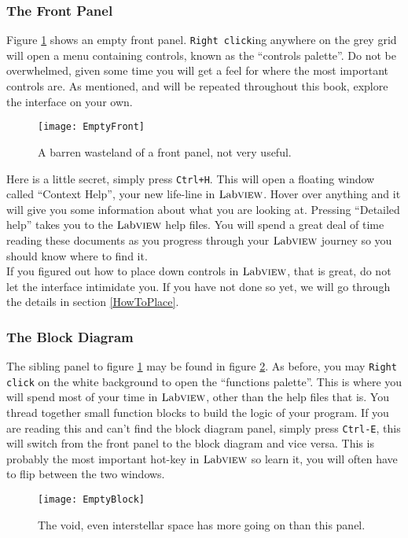 	\subsubsection{The Front Panel}
	Figure \ref{EmptyFront} shows an empty front panel. \texttt{Right click}ing anywhere on the grey grid will open a menu containing controls, known as the ``controls palette''. Do not be overwhelmed, given some time you will get a feel for where the most important controls are. As mentioned, and will be repeated throughout this book, explore the interface on your own.\\
	\begin{figure}
		\centering
		\texttt{[image: EmptyFront]}
		\caption{A barren wasteland of a front panel, not very useful.}
		\label{EmptyFront}
	\end{figure}

	Here is a little secret, simply press \texttt{Ctrl+H}. This will open a floating window called ``Context Help'', your new life-line in $\text{Lab}\textsc{view}$. Hover over anything and it will give you some information about what you are looking at.  Pressing ``Detailed help'' takes you to the $\text{Lab}\textsc{view}$ help files. You will spend a great deal of time reading these documents as you progress through your $\text{Lab}\textsc{view}$ journey so you should know where to find it.\\
	
	If you figured out how to place down controls in $\text{Lab}\textsc{view}$, that is great, do not let the interface intimidate you. If you have not done so yet, we will go through the details in section \ref{HowToPlace}.
	\subsubsection{The Block Diagram}
	The sibling panel to figure \ref{EmptyFront} may be found in figure \ref{EmptyBlock}. As before, you may \texttt{Right click} on the white background to open the ``functions palette''. This is where you will spend most of your time in $\text{Lab}\textsc{view}$, other than the help files that is. You thread together small function blocks to build the logic of your program. If you are reading this and can't find the block diagram panel, simply press \texttt{Ctrl-E}, this will switch from the front panel to the block diagram and vice versa. This is probably the most important hot-key in $\text{Lab}\textsc{view}$ so learn it, you will often have to flip between the two windows.\\
	\begin{figure}
		\centering
		\texttt{[image: EmptyBlock]}
		\caption{The void, even interstellar space has more going on than this panel.}
		\label{EmptyBlock}
	\end{figure}


